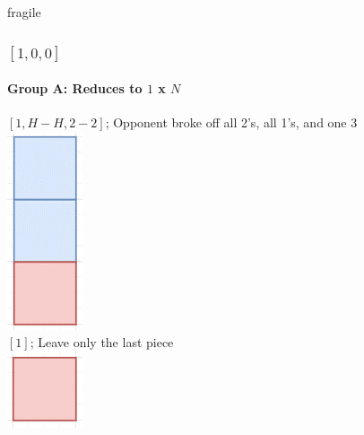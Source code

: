 \documentclass[aspectratio=169,usenames,dvipsnames]{beamer}
\begin{document}
\begin{frame}{fragile}
    \frametitle{$[1, 0, 0]$}
    \framesubtitle{Group A: Reduces to $1$ x $N$}
    
    \begin{multicols}{2}
    $[1, H - H, 2 - 2]$; Opponent broke off all 2’s, all 1’s, and one 3\\
    \includegraphics[scale=.4]{images/[1, 0, 0].png}\\
    $[1]$; Leave only the last piece\\
    \includegraphics[scale=.4]{images/[1].png}
    \end{multicols}
\end{frame}
\end{document}
